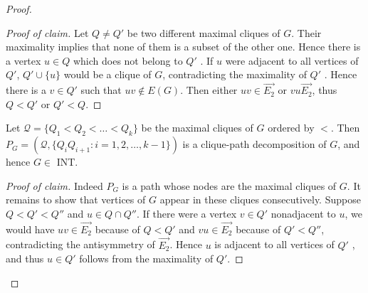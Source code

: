 \begin{proof}
\begin{enumerate}
		\begin{proof}[Proof of claim]
			Let $Q \neq Q'$ be two different maximal cliques of $G$. Their maximality implies that none of them is a subset of the other one. Hence there is a vertex $u \in Q$ which does not belong to $Q'$ . If $u$ were adjacent to all vertices of $Q'$, $Q' \cup \{u\}$ would be a clique of $G$, contradicting the maximality of $Q'$ . Hence there is a $v \in Q'$ such that $uv \notin E(G)$. Then either $uv \in \overrightarrow{E_2}$ or $vu \overrightarrow{E_2}$, thus $Q < Q'$ or $Q' < Q$.
		\end{proof}
		
		\begin{claim}
			Let $\mathcal{Q} = \{Q_1 < Q_2 < \dots < Q_k\}$ be the maximal cliques of $G$ ordered by $<$. Then $P_G = (\mathcal{Q}, \{Q_i Q_{i+1}: i = 1, 2, \dots, k - 1\})$ is a clique-path decomposition of $G$, and hence $G \in$ INT.
		\end{claim}
		
		\begin{proof}[Proof of claim]
			Indeed $P_G$ is a path whose nodes are the maximal cliques of $G$. It remains to show that vertices of $G$ appear in these cliques consecutively. Suppose $Q < Q' < Q''$ and $u \in Q \cap Q''$. If there were a vertex $v \in Q'$ nonadjacent to $u$, we would have $uv \in \overrightarrow{E_2}$ because of $Q < Q'$ and $vu \in \overrightarrow{E_2}$ because of $Q' < Q''$, contradicting the antisymmetry of $\overrightarrow{E_2}$. Hence $u$ is adjacent to all vertices of $Q'$ , and thus
			$u \in Q'$ follows from the maximality of $Q'$.
		\end{proof}
	\end{enumerate}
\end{proof}
